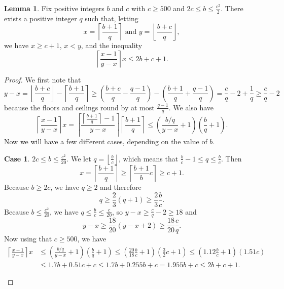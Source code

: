 \documentclass[12pt]{amsart}  %
\theoremstyle{definition}
\newtheorem{lemma}[theorem]{Lemma}
\newtheorem{case}{Case}
\theoremstyle{remark}
\numberwithin{equation}{section}
\begin{document}
\begin{lemma}\label{lem:analysis}
Fix positive integers $b$ and $c$ with $c\geq 500$ and $2c\leq b\leq\frac{c^2}2$. There exists a positive integer $q$ such that, letting
\begin{equation}
x=\left\lceil\frac{b+1}q\right\rceil\text{ and }y=\left\lfloor\frac{b+c}q\right\rfloor,
\end{equation} we have $x\geq c+1$, $x<y$, and the inequality
\begin{equation}
\left\lceil\frac{x-1}{y-x}\right\rceil x\leq 2b+c+1.
\end{equation}
\end{lemma}

\begin{proof}
We first note that
\begin{equation*}
y-x=\left\lfloor\frac{b+c}q\right\rfloor-\left\lceil\frac{b+1}q\right\rceil\geq\left(\frac{b+c}q-\frac{q-1}q\right)-\left(\frac{b+1}q+\frac{q-1}q\right)=\frac cq-2+\frac 1q\geq \frac cq-2
\end{equation*}
because the floors and ceilings round by at most $\frac{q-1}q$. We also have
\begin{equation*}
\left\lceil\frac{x-1}{y-x}\right\rceil x=\left\lceil\frac{\left\lceil\frac{b+1}q\right\rceil-1}{y-x}\right\rceil\left\lceil\frac{b+1}q\right\rceil\leq\left(\frac {b/q}{y-x}+1\right)\left(\frac bq+1\right).
\end{equation*}
Now we will have a few different cases, depending on the value of $b$.

\begin{case} $2c\leq b\leq \frac{c^2}{20}$. We let $q=\left\lfloor\frac bc\right\rfloor$, which means that $\frac bc-1\leq q\leq \frac bc$. Then
\begin{equation*}
x=\left\lceil\frac{b+1}q\right\rceil\geq\left\lceil\frac{b+1}bc\right\rceil\geq c+1.
\end{equation*}
Because $b\geq 2c$, we have $q\geq 2$ and therefore
\begin{equation*}
q\geq\frac 23(q+1)\geq \frac 23\frac bc.
\end{equation*} 
Because $b\leq \frac{c^2}{20}$, we have $q\leq\frac bc\leq\frac c{20}$, so $y-x\geq\frac cq-2\geq 18$ and 
\begin{equation*}
y-x\geq\frac {18}{20}(y-x+2)\geq\frac{18}{20}\frac cq.
\end{equation*}
Now using that $c\geq 500$, we have
\begin{align*}
\left\lceil\frac{x-1}{y-x}\right\rceil x&\leq\left(\frac {b/q}{y-x}+1\right)\left(\frac bq+1\right)\leq\left(\frac{20}{18}\frac bc+1\right)\left(\frac 32c+1\right)\leq(1.12\frac bc+1)(1.51c)\\&\leq 1.7b+0.51c+c\leq 1.7b+0.255b+c=1.955b+c\leq 2b+c+1.
\end{align*}
\end{case}


\end{proof}
\end{document}
